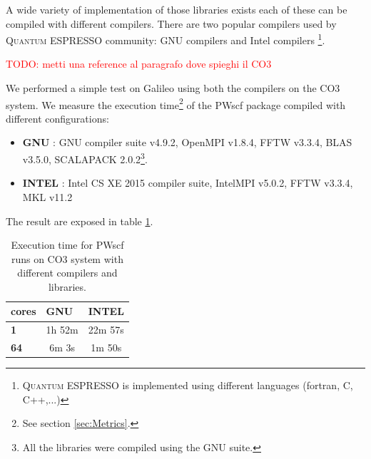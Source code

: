 \documentclass[a4paper,12pt]{article}
\newcommand\mynotes[1]{\begin{flushright}

\textcolor{red}{TODO: #1}\end{flushright}}
\newcommand\QE{\textsc{Quantum} ESPRESSO }
\newcommand\CO{CO3 }
\begin{document}
A wide variety of implementation of those libraries exists each of these can be compiled with different compilers.
There are two popular compilers used by \QE community: GNU compilers and Intel compilers \footnote{\QE is implemented using different languages (fortran, C, C++,...) }.


\mynotes{metti una reference al paragrafo dove spieghi il \CO}
We performed a simple test on Galileo using both the compilers on the \CO system. 
We measure the execution time\footnote{See section \ref{sec:Metrics}.} of the PWscf package compiled with different configurations: 
\begin{itemize}
	\item \textbf{GNU} : GNU compiler suite v4.9.2, OpenMPI v1.8.4, FFTW v3.3.4, BLAS v3.5.0, SCALAPACK 2.0.2\footnote{ All the libraries were compiled using the GNU suite.}.
	\item \textbf{INTEL} : Intel CS XE 2015 compiler suite, IntelMPI v5.0.2,  FFTW v3.3.4, MKL v11.2
\end{itemize}
The result are exposed in table \ref{tab:libraries}.

\begin{table}[h]
\centering
\begin{tabular}{lcc}
\textbf{cores} & \multicolumn{1}{l}{\textbf{GNU}}  & \multicolumn{1}{l}{\textbf{INTEL}} \\ \hline \hline
\textbf{1}     & 1h 52m                            & 22m 57s                            \\
\textbf{64}    & 6m 3s                            		& 1m 50s                            
\end{tabular}
\caption{Execution time for PWscf runs on CO3 system with different compilers and libraries.}
\label{tab:libraries}
\end{table}

\end{document}
